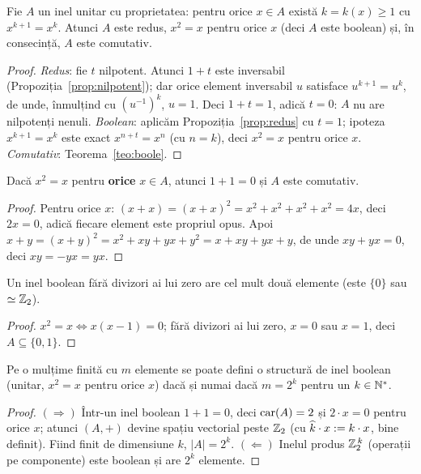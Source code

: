 \begin{teorema}[condiția $x^{k+1}=x^k$ dă inel boolean]\label{teo:kk1}
Fie $A$ un inel unitar cu proprietatea: pentru orice $x\in A$ există $k=k(x)\ge1$ cu $x^{k+1}=x^k$. Atunci $A$ este redus, $x^2=x$ pentru orice $x$ (deci $A$ este boolean) și, în consecință, $A$ este comutativ.
\end{teorema}

\begin{proof}
\emph{Redus}: fie $t$ nilpotent. Atunci $1+t$ este inversabil (Propoziția~\ref{prop:nilpotent}); dar orice element inversabil $u$ satisface $u^{k+1}=u^k$, de unde, înmulțind cu $(u^{-1})^k$, $u=1$. Deci $1+t=1$, adică $t=0$: $A$ nu are nilpotenți nenuli.
\emph{Boolean}: aplicăm Propoziția~\ref{prop:redus} cu $t=1$; ipoteza $x^{k+1}=x^k$ este exact $x^{n+t}=x^n$ (cu $n=k$), deci $x^{2}=x$ pentru orice $x$.
\emph{Comutativ}: Teorema~\ref{teo:boole}.
\end{proof}



\begin{teorema}\label{teo:boole}
Dacă $x^2=x$ pentru \textbf{orice} $x\in A$, atunci $1+1=0$ și $A$ este comutativ.
\end{teorema}

\begin{proof}
Pentru orice $x$: $(x+x)=(x+x)^2=x^2+x^2+x^2+x^2=4x$, deci $2x=0$, adică fiecare element este propriul opus. Apoi
$x+y=(x+y)^2=x^2+xy+yx+y^2=x+xy+yx+y$, de unde $xy+yx=0$, deci $xy=-yx=yx$.
\end{proof}

\begin{corolar}\label{cor:boolefarad}
Un inel boolean fără divizori ai lui zero are cel mult două elemente (este $\{0\}$ sau $\simeq\mathbb{Z}_2$).
\end{corolar}

\begin{proof}
$x^2=x\iff x(x-1)=0$; fără divizori ai lui zero, $x=0$ sau $x=1$, deci $A\subseteq\{0,1\}$.
\end{proof}

\begin{propozitie}\label{prop:boolcard}
Pe o mulțime finită cu $m$ elemente se poate defini o structură de inel boolean (unitar, $x^2=x$ pentru orice $x$) dacă și numai dacă $m=2^k$ pentru un $k\in\mathbb{N}^*$.
\end{propozitie}
\begin{proof}
$(\Rightarrow)$ Într-un inel boolean $1+1=0$, deci $\operatorname{car}(A)=2$ și $2\cdot x=0$ pentru orice $x$; atunci $(A,+)$ devine spațiu vectorial peste $\mathbb{Z}_2$ (cu $\widehat{k}\cdot x:=k\cdot x$, bine definit). Fiind finit de dimensiune $k$, $|A|=2^k$.
$(\Leftarrow)$ Inelul produs $\mathbb{Z}_2^{\,k}$ (operații pe componente) este boolean și are $2^k$ elemente.
\end{proof}


